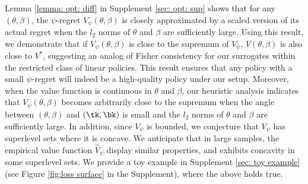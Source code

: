 \documentclass[preprint] {imsart}
\begin{document}
{  Lemma \ref{lemma: opt: diff} in Supplement \ref{sec: opt: sup} shows that for 
  any $(\theta,\beta)$, the $\psi$-regret $V_\psi(\theta,\beta)$ is closely approximated by 
a scaled version of its actual regret when the $l_2$ norms of $\theta$ and $\beta$ are sufficiently large. Using this result, we demonstrate that if  $V_\psi(\theta,\beta)$ is close to the supremum of $V_\psi$, $V(\theta,\beta)$ is also close to $V^*$, suggesting an analog of Fisher consistency for our surrogates within the restricted class of linear policies. This result ensures that any policy with a small $\psi$-regret  will indeed be a high-quality policy under our setup.    Moreover, when the value function is continuous in $\theta$ and $\beta$, our heuristic analysis indicates that $V_\psi(\theta,\beta)$ becomes arbitrarily close to the supremum when the angle between $(\theta,\beta)$ and $(\tk,\bk)$ is small and the $l_2$ norms of $\theta$ and $\beta$ are sufficiently large. In addition, since $V_\psi$ is bounded, we conjecture that $V_\psi$  has superlevel sets where it is concave. 
We anticipate that in large samples, the empirical value function $\widehat V_\psi$ display similar properties, and exhibits concavity in some superlevel sets.  We provide a toy example in Supplement \ref{sec: toy example} (see  Figure \ref{fig:loss surface} in the Supplement), where the above holds true. 

}
\end{document}
